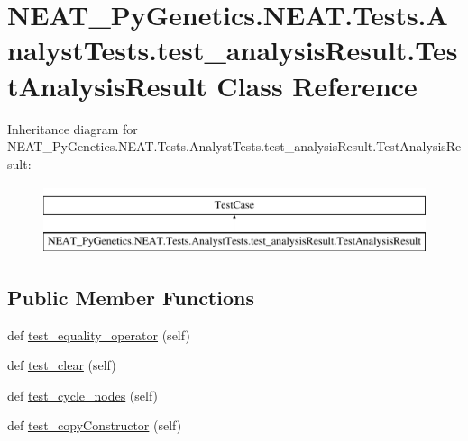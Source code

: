 \hypertarget{classNEAT__PyGenetics_1_1NEAT_1_1Tests_1_1AnalystTests_1_1test__analysisResult_1_1TestAnalysisResult}{}\section{N\+E\+A\+T\+\_\+\+Py\+Genetics.\+N\+E\+A\+T.\+Tests.\+Analyst\+Tests.\+test\+\_\+analysis\+Result.\+Test\+Analysis\+Result Class Reference}
\label{classNEAT__PyGenetics_1_1NEAT_1_1Tests_1_1AnalystTests_1_1test__analysisResult_1_1TestAnalysisResult}
Inheritance diagram for N\+E\+A\+T\+\_\+\+Py\+Genetics.\+N\+E\+A\+T.\+Tests.\+Analyst\+Tests.\+test\+\_\+analysis\+Result.\+Test\+Analysis\+Result\+:\begin{figure}[H]
\begin{center}
\leavevmode
\includegraphics[height=2.000000cm]{classNEAT__PyGenetics_1_1NEAT_1_1Tests_1_1AnalystTests_1_1test__analysisResult_1_1TestAnalysisResult}
\end{center}
\end{figure}
\subsection*{Public Member Functions}
\begin{DoxyCompactItemize}
\item 
def \hyperlink{classNEAT__PyGenetics_1_1NEAT_1_1Tests_1_1AnalystTests_1_1test__analysisResult_1_1TestAnalysisResult_ac7be3b7805195cdf50e994684a89e9a6}{test\+\_\+equality\+\_\+operator} (self)
\item 
def \hyperlink{classNEAT__PyGenetics_1_1NEAT_1_1Tests_1_1AnalystTests_1_1test__analysisResult_1_1TestAnalysisResult_a936ce5fd67dd44d516a1cb5c9d3fe282}{test\+\_\+clear} (self)
\item 
def \hyperlink{classNEAT__PyGenetics_1_1NEAT_1_1Tests_1_1AnalystTests_1_1test__analysisResult_1_1TestAnalysisResult_a53fa99c33443988b4d9ec4bc99f6c252}{test\+\_\+cycle\+\_\+nodes} (self)
\item 
def \hyperlink{classNEAT__PyGenetics_1_1NEAT_1_1Tests_1_1AnalystTests_1_1test__analysisResult_1_1TestAnalysisResult_a8f560a4866c15837720dcf43ba95c725}{test\+\_\+copy\+Constructor} (self)
\end{DoxyCompactItemize}


